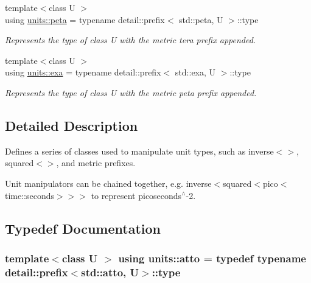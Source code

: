 \begin{DoxyCompactItemize}
{\footnotesize template$<$class U $>$ }\\using \hyperlink{group___unit_manipulators_ga1a39274621859b9e6cf6e7019cd14e47}{units\+::peta} = typename detail\+::prefix$<$ std\+::peta, U $>$\+::type
\begin{DoxyCompactList}\small\item\em Represents the type of {\ttfamily class U} with the metric \textquotesingle{}tera\textquotesingle{} prefix appended. \end{DoxyCompactList}\item 
{\footnotesize template$<$class U $>$ }\\using \hyperlink{group___unit_manipulators_gad0c18c5a47e0fe677715f0328f818515}{units\+::exa} = typename detail\+::prefix$<$ std\+::exa, U $>$\+::type
\begin{DoxyCompactList}\small\item\em Represents the type of {\ttfamily class U} with the metric \textquotesingle{}peta\textquotesingle{} prefix appended. \end{DoxyCompactList}\end{DoxyCompactItemize}


\subsection{Detailed Description}
Defines a series of classes used to manipulate unit types, such as {\ttfamily inverse$<$$>$}, {\ttfamily squared$<$$>$}, and metric prefixes. 

Unit manipulators can be chained together, e.\+g. {\ttfamily inverse$<$squared$<$pico$<$time\+::seconds$>$$>$$>$} to represent picoseconds$^\wedge$-\/2. 

\subsection{Typedef Documentation}
\hypertarget{group___unit_manipulators_ga8a7180c782263384a118dc8ffa5bc689}{}
\subsubsection[{atto}]{\setlength{\rightskip}{0pt plus 5cm}template$<$class U $>$ using {\bf units\+::atto} = typedef typename detail\+::prefix$<$std\+::atto, U$>$\+::type}\label{group___unit_manipulators_ga8a7180c782263384a118dc8ffa5bc689}


